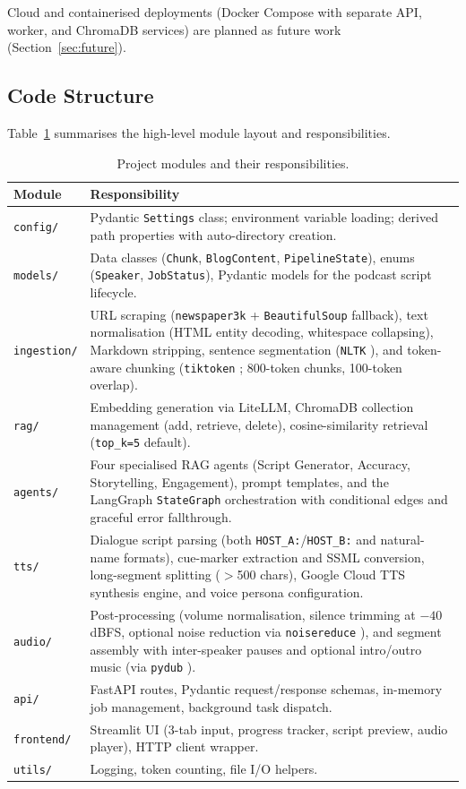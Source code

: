 \documentclass[sigconf,natbib=false]{acmart}   %
\begin{document}
Cloud and containerised deployments (Docker Compose with separate API, worker, and ChromaDB services) are planned as future work (Section~\ref{sec:future}).

\subsection{Code Structure}
Table~\ref{tab:modules} summarises the high-level module layout and responsibilities.

\begin{table}[H]
\centering
\small
\begin{tabular}{lp{6.0cm}}
\toprule
\textbf{Module} & \textbf{Responsibility}\\
\midrule
\texttt{config/}     & Pydantic \texttt{Settings} class; environment variable loading; derived path properties with auto-directory creation.\\
\texttt{models/}     & Data classes (\texttt{Chunk}, \texttt{BlogContent}, \texttt{PipelineState}), enums (\texttt{Speaker}, \texttt{JobStatus}), Pydantic models for the podcast script lifecycle.\\
\texttt{ingestion/}  & URL scraping (\texttt{newspaper3k} + \texttt{BeautifulSoup} fallback), text normalisation (HTML entity decoding, whitespace collapsing), Markdown stripping, sentence segmentation (\texttt{NLTK} \cite{NLTK2024}), and token-aware chunking (\texttt{tiktoken} \cite{Tiktoken2024}; 800-token chunks, 100-token overlap).\\
\texttt{rag/}        & Embedding generation via LiteLLM, ChromaDB collection management (add, retrieve, delete), cosine-similarity retrieval (\texttt{top\_k=5} default).\\
\texttt{agents/}     & Four specialised RAG agents (Script Generator, Accuracy, Storytelling, Engagement), prompt templates, and the LangGraph \texttt{StateGraph} orchestration with conditional edges and graceful error fallthrough.\\
\texttt{tts/}        & Dialogue script parsing (both \texttt{HOST\_A:}/\texttt{HOST\_B:} and natural-name formats), cue-marker extraction and SSML conversion, long-segment splitting ($>$500 chars), Google Cloud TTS synthesis engine, and voice persona configuration.\\
\texttt{audio/}      & Post-processing (volume normalisation, silence trimming at $-40$\,dBFS, optional noise reduction via \texttt{noisereduce} \cite{NoiseReduce2024}), and segment assembly with inter-speaker pauses and optional intro/outro music (via \texttt{pydub} \cite{PyDub2024}).\\
\texttt{api/}        & FastAPI routes, Pydantic request/response schemas, in-memory job management, background task dispatch.\\
\texttt{frontend/}   & Streamlit UI (3-tab input, progress tracker, script preview, audio player), HTTP client wrapper.\\
\texttt{utils/}      & Logging, token counting, file I/O helpers.\\
\bottomrule
\end{tabular}
\caption{Project modules and their responsibilities.}
\label{tab:modules}
\end{table}
\end{document}
